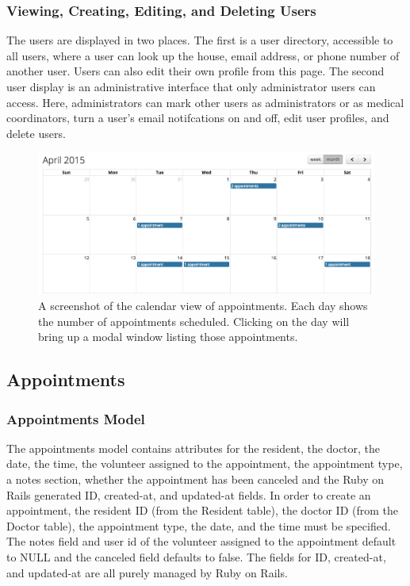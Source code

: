 \documentclass{sig-alternate}
\begin{document}
\subsubsection{Viewing, Creating, Editing, and Deleting Users}
The users are displayed in two places. The first is a user directory, accessible to all users, where a user can look up the house, email address, or phone number of another user. Users can also edit their own profile from this page. The second user display is an administrative interface that only administrator users can access. Here, administrators can mark other users as administrators or as medical coordinators, turn a user's email notifcations on and off, edit user profiles, and delete users.

\begin{figure}
\includegraphics[scale=0.4]{Calendar}
\caption{A screenshot of the calendar view of appointments. Each day shows the number of appointments scheduled. Clicking on the day will bring up a modal window listing those appointments.}
\end{figure}

\subsection{Appointments}

\subsubsection{Appointments Model}
The appointments model contains attributes for the resident, the doctor, the date, the time, the volunteer assigned to the appointment, the appointment type, a notes section, whether the appointment has been canceled and the Ruby on Rails generated ID, created-at, and updated-at fields. In order to create an appointment, the resident ID (from the Resident table), the doctor ID (from the Doctor table), the appointment type, the date, and the time must be specified. The notes field and user id of the volunteer assigned to the appointment default to NULL and the canceled field defaults to false. The fields for ID, created-at, and updated-at are all purely managed by Ruby on Rails. 
\end{document}
